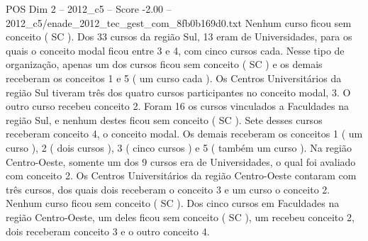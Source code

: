 \begin{textsample}{POS Dim 2 – 2012\_c5 – Score -2.00 – 2012\_c5/enade\_2012\_tec\_gest\_com\_8fb0b169d0.txt}
Nenhum curso ficou sem conceito ( SC ).
Dos 33 cursos da região Sul, 13 eram de Universidades, para os quais o conceito modal ficou entre 3 e 4, com cinco cursos cada.
Nesse tipo de organização, apenas um dos cursos ficou sem conceito ( SC ) e os demais receberam os conceitos 1 e 5 ( um curso cada ).
Os Centros Universitários da região Sul tiveram três dos quatro cursos participantes no conceito modal, 3.
O outro curso recebeu conceito 2.
Foram 16 os cursos vinculados a Faculdades na região Sul, e nenhum destes ficou sem conceito ( SC ).
Sete desses cursos receberam conceito 4, o conceito modal.
Os demais receberam os conceitos 1 ( um curso ), 2 ( dois cursos ), 3 ( cinco cursos ) e 5 ( também um curso ).
Na região Centro-Oeste, somente um dos 9 cursos era de Universidades, o qual foi avaliado com conceito 2.
Os Centros Universitários da região Centro-Oeste contaram com três cursos, dos quais dois receberam o conceito 3 e um curso o conceito 2.
Nenhum curso ficou sem conceito ( SC ).
Dos cinco cursos em Faculdades na região Centro-Oeste, um deles ficou sem conceito ( SC ), um recebeu conceito 2, dois receberam conceito 3 e o outro conceito 4.

\end{textsample}
